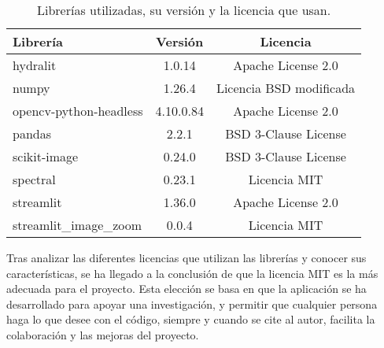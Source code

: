 \begin{table}[h!]
\centering
\begin{tabular}{|l|c|c|}
\hline \textbf{Librería} &\textbf{Versión} & \textbf{Licencia}\\ 
\hline hydralit & 1.0.14 &  Apache License 2.0\\
\hline numpy & 1.26.4 & Licencia BSD modificada\\
\hline opencv-python-headless & 4.10.0.84 & Apache License 2.0\\
\hline pandas & 2.2.1 & BSD 3-Clause License\\
\hline scikit-image & 0.24.0 & BSD 3-Clause License\\
\hline spectral & 0.23.1 & Licencia MIT\\
\hline streamlit & 1.36.0 & Apache License 2.0\\
\hline streamlit\_image\_zoom & 0.0.4 & Licencia MIT\\
\hline
\end{tabular}
\caption{Librerías utilizadas, su versión y la licencia que usan.}
\label{tab:librerias-licencias}
\end{table}

Tras analizar las diferentes licencias que utilizan las librerías y conocer sus características, se ha llegado a la conclusión de que la licencia MIT es la más adecuada para el proyecto. Esta elección se basa en que la aplicación se ha desarrollado para apoyar una investigación, y permitir que cualquier persona haga lo que desee con el código, siempre y cuando se cite al autor, facilita la colaboración y las mejoras del proyecto.

